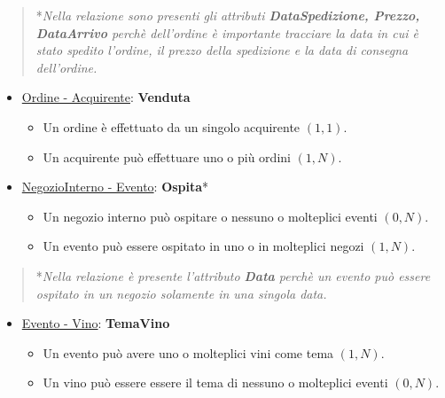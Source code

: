 \begin{verse}
	*\emph{Nella relazione sono presenti gli attributi \textbf{DataSpedizione, Prezzo, DataArrivo} perchè dell'ordine è importante tracciare la data in cui è stato spedito l'ordine, il prezzo della spedizione e la data di consegna dell'ordine.}
\end{verse}

\begin{itemize}
	\item \underline{Ordine - Acquirente}: \textbf{Venduta}
	
	\begin{itemize}
		\item Un ordine è effettuato da un singolo acquirente $(1,1)$.
		\item Un acquirente può effettuare uno o più ordini $(1,N)$.
	\end{itemize}
	
\end{itemize}

\begin{itemize}
	\item \underline{NegozioInterno - Evento}: \textbf{Ospita}*
	
	\begin{itemize}
		\item Un negozio interno può ospitare o nessuno o molteplici eventi $(0,N)$.
		\item Un evento può essere ospitato in uno o in molteplici negozi $(1,N)$.
	\end{itemize}
	
\end{itemize}

\begin{verse}
	*\emph{Nella relazione è presente l'attributo \textbf{Data} perchè un evento può essere ospitato in un negozio solamente in una singola data.}
\end{verse}


\begin{itemize}
	\item \underline{Evento - Vino}: \textbf{TemaVino}
	
	\begin{itemize}
		\item Un evento può avere uno o molteplici vini come tema $(1,N)$.
		\item Un vino può essere essere il tema di nessuno o molteplici eventi $(0,N)$.
	\end{itemize}
	
\end{itemize}

